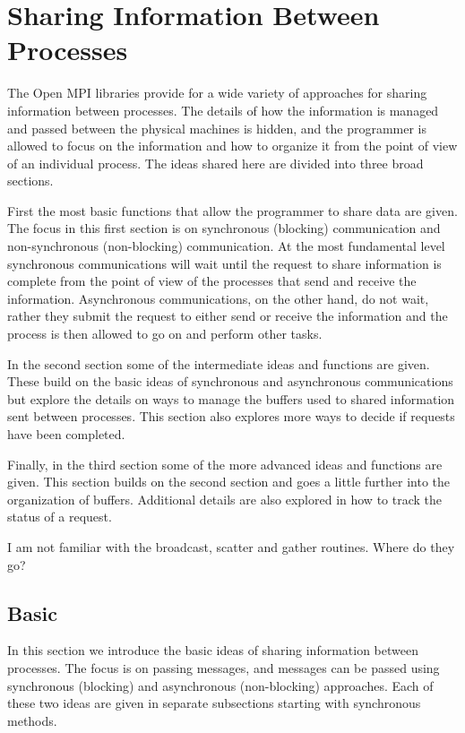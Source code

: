 \chapter{Sharing Information Between Processes}


The Open MPI libraries provide for a wide variety of approaches for
sharing information between processes. The details of how the
information is managed and passed between the physical machines is
hidden, and the programmer is allowed to focus on the information and
how to organize it from the point of view of an individual
process. The ideas shared here are divided into three broad sections.

First the most basic functions that allow the programmer to share data
are given. The focus in this first section is on synchronous
(blocking) communication and non-synchronous (non-blocking)
communication. At the most fundamental level synchronous
communications will wait until the request to share information is
complete from the point of view of the processes that send and receive
the information. Asynchronous communications, on the other hand, do
not wait, rather they submit the request to either send or receive the
information and the process is then allowed to go on and perform other
tasks.

In the second section some of the intermediate ideas and functions are
given. These build on the basic ideas of synchronous and asynchronous
communications but explore the details on ways to manage the buffers
used to shared information sent between processes. This section also
explores more ways to decide if requests have been completed.

Finally, in the third section some of the more advanced ideas and
functions are given. This section builds on the second section and
goes a little further into the organization of buffers. Additional
details are also explored in how to track the status of a request.

\todo I am not familiar with the broadcast, scatter and gather
routines. Where do they go?


\section{Basic}

In this section we introduce the basic ideas of sharing information
between processes. The focus is on passing messages, and messages can
be passed using synchronous (blocking) and asynchronous (non-blocking)
approaches. Each of these two ideas are given in separate subsections
starting with synchronous methods.

